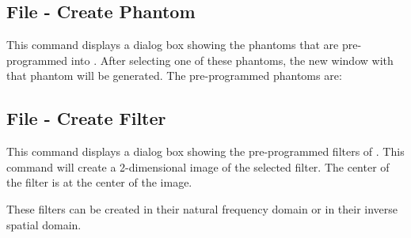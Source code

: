\subsection{File - Create Phantom}\label{IDH_DLG_PHANTOM}
This command displays a dialog box showing the phantoms that are pre-programmed
into \ctsim. After selecting one of these phantoms, the new window with that
phantom will be generated. The pre-programmed phantoms are:

\begin{twocollist}
\end{twocollist}

\subsection{File - Create Filter}\label{IDH_DLG_FILTER}
This command displays a dialog box showing the pre-programmed filters
of \ctsim. This command will create a 2-dimensional image of the selected filter.
The center of the filter is at the center of the image.

These filters can be created in their natural frequency domain or in their inverse
spatial domain.

